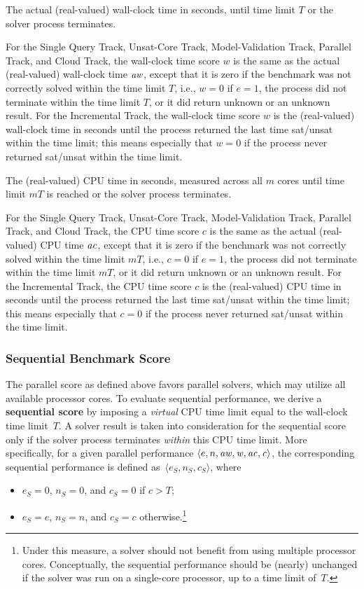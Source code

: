 \documentclass[12pt]{article}
\newcommand{\maintrack}{Single Query Track\xspace}
\newcommand{\inctrack}{Incremental Track\xspace}
\newcommand{\ucoretrack}{Unsat-Core Track\xspace}
\newcommand{\mvaltrack}{Model-Validation Track\xspace}
\newcommand{\paralleltrack}{Parallel Track\xspace}
\newcommand{\cloudtrack}{Cloud Track\xspace}
\begin{document}
The actual (real-valued) wall-clock time in seconds, until time limit $T$ or the
solver process terminates.

For the \maintrack, \ucoretrack, \mvaltrack, \paralleltrack, and
\cloudtrack, the wall-clock time score $w$ is the same as
the actual (real-valued) wall-clock time $\it{aw}$,
except that it is zero if the benchmark was not correctly solved within the time limit $T$, i.e.,
$w = 0$ if $e = 1$, the process did not terminate within the time limit $T$, or
it did return unknown or an unknown result.
For the \inctrack, the wall-clock time score $w$
is the (real-valued) wall-clock time in seconds until the process returned the last time sat/unsat within the time limit;
this means especially that $w = 0$ if the process never returned sat/unsat within the time limit.

The (real-valued) CPU time in seconds, measured across all $m$ cores
until time limit $mT$ is reached or the solver process
terminates.

For the \maintrack, \ucoretrack, \mvaltrack, \paralleltrack, and
\cloudtrack, the CPU time score $c$ is the same as
the actual (real-valued) CPU time $\it{ac}$,
except that it is zero if the benchmark was not correctly solved within the time limit $mT$, i.e.,
$c = 0$ if $e = 1$, the process did not terminate within the time limit $mT$, or
it did return unknown or an unknown result.
For the \inctrack, the CPU time score $c$
is the (real-valued) CPU time in seconds until the process returned the last time sat/unsat within the time limit;
this means especially that $c = 0$ if the process never returned sat/unsat within the time limit.

\subsubsection{Sequential Benchmark Score}
\label{sec:sequential}

The parallel score as defined above favors parallel solvers, which may utilize
all available processor cores.  To evaluate sequential performance, we derive a
\textbf{sequential score} by imposing a \emph{virtual} CPU time limit equal to
the wall-clock time limit~$T$.  A solver result is taken into consideration for
the sequential score only if the solver process terminates \emph{within} this
CPU time limit.  More specifically, for a given parallel performance $\langle
e, n, \it{aw}, w, \it{ac}, c\rangle$, the corresponding sequential performance is defined
as~$\langle e_S, n_S, c_S\rangle$, where
\begin{itemize}
\item $e_S = 0$, $n_S = 0$, and $c_S = 0$ if $c > T$;
\item $e_S = e$, $n_S = n$, and $c_S = c$
  otherwise.\footnote{Under this
  measure, a solver should not benefit from using multiple processor
  cores.  Conceptually, the sequential performance should be (nearly)
  unchanged if the solver was run on a single-core processor, up to a
  time limit of~$T$.}
\end{itemize}
\end{document}
